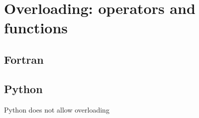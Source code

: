 
\chapter{Overloading: operators and functions}

 
\newpage  
\section{Fortran}

 
\newpage
\section{Python}

Python does not allow overloading 

